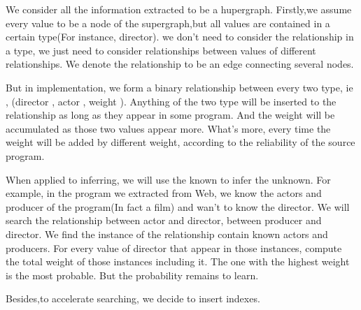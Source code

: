 We consider all the information extracted to be a hupergraph.
Firstly,we assume every value to be a node of  the supergraph,but all values 
are contained in a certain type(For instance, director). we don't need to 
consider the relationship in a type, we just need to consider relationships between 
values of different relationships. We denote the relationship to be an edge connecting 
several nodes.

	But in implementation, we form a binary relationship between every two type, ie , 
(director , actor , weight ). Anything of the two type will be inserted to the relationship 
as long as they appear in some program. And the weight will be accumulated as those two values 
appear more. What's more, every time the weight will be added by different weight, according to 
the reliability of the source program.

	When applied to inferring, we will use the known to infer the unknown. For example, in the program 
we extracted from Web, we know the actors and producer of the program(In fact a film) and wan't to know the 
director. We will search the relationship between actor and director, between producer and director. We find 
the instance of the relationship contain known actors and producers. For every value of director that appear 
in those instances, compute the total weight of those instances including it. The one with the highest weight 
is the most probable. But the probability remains to learn.

	Besides,to accelerate searching, we decide to insert indexes.
	 